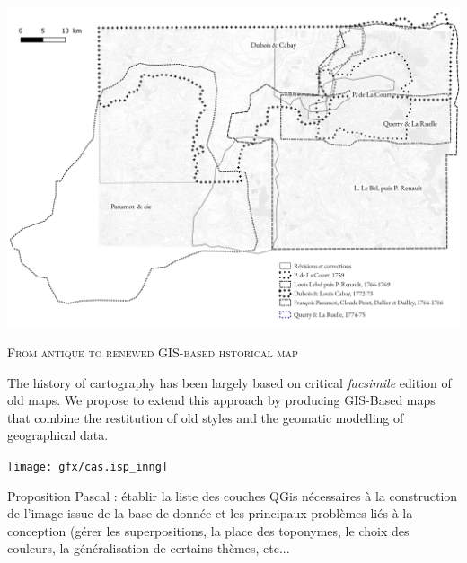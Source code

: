 \documentclass[portrait, A0]{sciposter}
\begin{document}
\begin{minipage}[b]{77cm}
\begin{multicols}{3}
\begin{center}
 \label{map:contours}
 \includegraphics[width=21cm]{gfx/Contours.png}
 \end{center}

\normalsize
\textsc{From antique to renewed GIS-based hstorical map}

The history of cartography has been largely based on critical \emph{facsimile} edition of old maps. We propose to extend this approach by producing GIS-Based maps that combine the restitution of old styles and the geomatic modelling of geographical data.

\vfill

\begin{center}
 \texttt{[image: gfx/cas.isp\_inng]}
 \end{center}

\scriptsize Proposition Pascal : établir la liste des couches QGis nécessaires à la construction de l'image issue de la base de donnée et les principaux problèmes liés à la conception (gérer les superpositions, la place des toponymes, le choix des couleurs, la généralisation de certains thèmes, etc...
\end{multicols}
\end{minipage}
\end{document}
